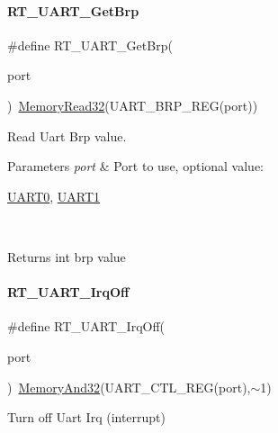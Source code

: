 \paragraph{\texorpdfstring{R\+T\+\_\+\+U\+A\+R\+T\+\_\+\+Get\+Brp}{RT\_UART\_GetBrp}}
{\footnotesize\ttfamily \#define R\+T\+\_\+\+U\+A\+R\+T\+\_\+\+Get\+Brp(\begin{DoxyParamCaption}\item[{}]{port }\end{DoxyParamCaption})~\mbox{\hyperlink{a00068_a2d484dc15bdf30ee11ab3b05f31f0e16}{Memory\+Read32}}(U\+A\+R\+T\+\_\+\+B\+R\+P\+\_\+\+R\+EG(port))}



Read Uart Brp value. 


\begin{DoxyParams}{Parameters}
{\em port} & Port to use, optional value\+:
\begin{DoxyCode}
\mbox{\hyperlink{a00173_a0508661f121639ffdee7de2353a0def2}{UART0}}, \mbox{\hyperlink{a00173_a8d69bf04d07af4fbbab5a8bd291f65ff}{UART1}}
\end{DoxyCode}
 \\
\hline
\end{DoxyParams}
\begin{DoxyReturn}{Returns}
int brp value 
\end{DoxyReturn}
\mbox{\label{a00173_acf04f21e0b0f598ac00a1a08eb4e5f2e}} 
\paragraph{\texorpdfstring{R\+T\+\_\+\+U\+A\+R\+T\+\_\+\+Irq\+Off}{RT\_UART\_IrqOff}}
{\footnotesize\ttfamily \#define R\+T\+\_\+\+U\+A\+R\+T\+\_\+\+Irq\+Off(\begin{DoxyParamCaption}\item[{}]{port }\end{DoxyParamCaption})~\mbox{\hyperlink{a00068_ad87cedffcaadc51db22594fce55173d4}{Memory\+And32}}(U\+A\+R\+T\+\_\+\+C\+T\+L\+\_\+\+R\+EG(port),$\sim$1)}



Turn off Uart Irq (interrupt) 


